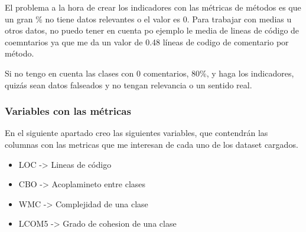 \documentclass[
]{article}
\providecommand{\tightlist}{%
  \setlength{\itemsep}{0pt}\setlength{\parskip}{0pt}}
\begin{document}
El problema a la hora de crear los indicadores con las métricas de
métodos es que un gran \% no tiene datos relevantes o el valor es 0.
Para trabajar con medias u otros datos, no puedo tener en cuenta po
ejemplo le media de lineas de código de coemntarios ya que me da un
valor de 0.48 líneas de codigo de comentario por método.

Si no tengo en cuenta las clases con 0 comentarios, 80\%, y haga los
indicadores, quizás sean datos falseados y no tengan relevancia o un
sentido real.

\hypertarget{variables-con-las-muxe9tricas}{%
\subsubsection{Variables con las
métricas}\label{variables-con-las-muxe9tricas}}

En el siguiente apartado creo las siguientes variables, que contendrán
las columnas con las metricas que me interesan de cada uno de los
dataset cargados.

\begin{itemize}
\tightlist
\item
  LOC -\textgreater{} Lineas de código
\item
  CBO -\textgreater{} Acoplamineto entre clases
\item
  WMC -\textgreater{} Complejidad de una clase
\item
  LCOM5 -\textgreater{} Grado de cohesion de una clase
\end{itemize}
\end{document}
